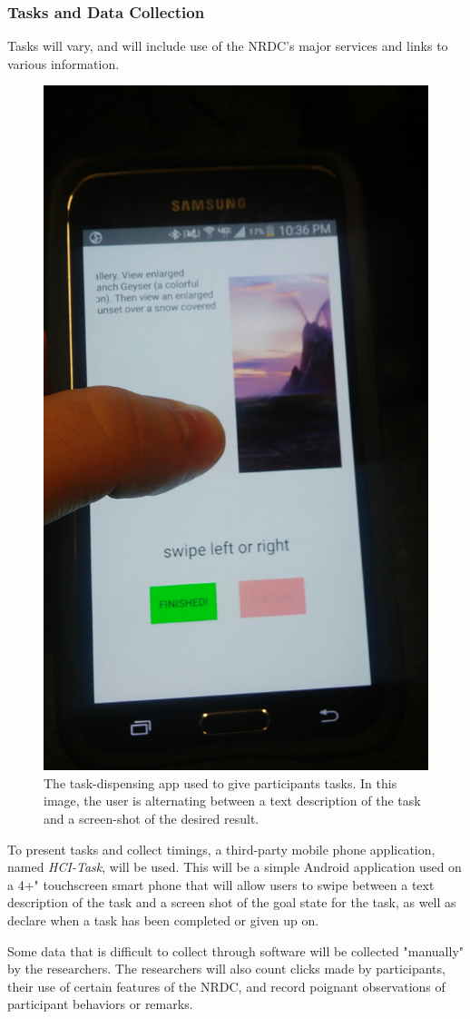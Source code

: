 \documentclass{article}
\begin{document}
\subsubsection{Tasks and Data Collection}
Tasks will vary, and will include use of the NRDC's major services and links to various information.

\begin{figure}[h!]
  \centering
  \includegraphics[width=.3\linewidth]{task_app}
  \caption{The task-dispensing app used to give participants tasks. In this image, the user is alternating between a text description of the task and a screen-shot of the desired result.}
  \label{fig:task_app}
\end{figure}

To present tasks and collect timings, a third-party mobile phone application, named \emph{HCI-Task}, will be used. This will be a simple Android application used on a 4+" touchscreen smart phone that will allow users to swipe between a text description of the task and a screen shot of the goal state for the task, as well as declare when a task has been completed or given up on.

Some data that is difficult to collect through software will be collected "manually" by the researchers. The researchers will also count clicks made by participants, their use of certain features of the NRDC, and record poignant observations of participant behaviors or remarks.

%
\end{document}
